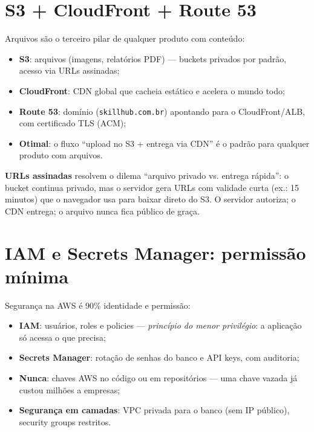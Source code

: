 \section{S3 + CloudFront + Route 53}

Arquivos são o terceiro pilar de qualquer produto com conteúdo:

\begin{itemize}[leftmargin=*, itemsep=0.4em]
  \item \textbf{S3}: arquivos (imagens, relatórios PDF) — buckets privados por padrão, acesso via URLs assinadas;
  \item \textbf{CloudFront}: CDN global que cacheia estático e acelera o mundo todo;
  \item \textbf{Route 53}: domínio (\texttt{skillhub.com.br}) apontando para o CloudFront/ALB, com certificado TLS (ACM);
  \item \textbf{Otimal}: o fluxo ``upload no S3 + entrega via CDN'' é o padrão para qualquer produto com arquivos.
\end{itemize}

\begin{caixaconceito}
\textbf{URLs assinadas} resolvem o dilema ``arquivo privado vs. entrega
rápida'': o bucket continua privado, mas o servidor gera URLs com validade
curta (ex.: 15 minutos) que o navegador usa para baixar direto do S3. O
servidor autoriza; o CDN entrega; o arquivo nunca fica público de graça.
\end{caixaconceito}

\section{IAM e Secrets Manager: permissão mínima}

Segurança na AWS é 90\% identidade e permissão:

\begin{itemize}[leftmargin=*, itemsep=0.4em]
  \item \textbf{IAM}: usuários, roles e policies — \emph{princípio do menor privilégio}: a aplicação só acessa o que precisa;
  \item \textbf{Secrets Manager}: rotação de senhas do banco e API keys, com auditoria;
  \item \textbf{Nunca}: chaves AWS no código ou em repositórios — uma chave vazada já custou milhões a empresas;
  \item \textbf{Segurança em camadas}: VPC privada para o banco (sem IP público), security groups restritos.
\end{itemize}

